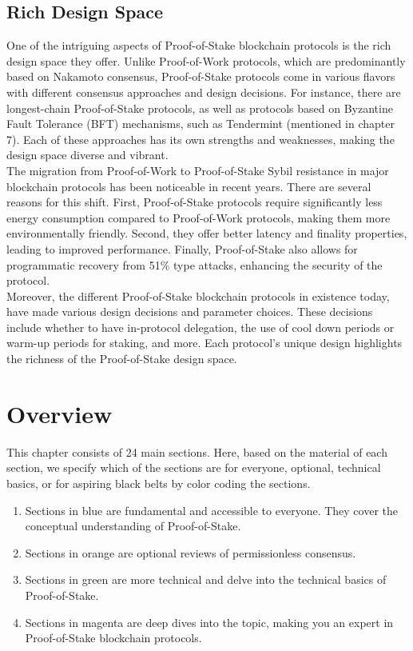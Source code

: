 \subsection*{Rich Design Space}
One of the intriguing aspects of Proof-of-Stake blockchain protocols is the rich design space they offer. Unlike Proof-of-Work protocols, which are predominantly based on Nakamoto consensus, Proof-of-Stake protocols come in various flavors with different consensus approaches and design decisions. For instance, there are longest-chain Proof-of-Stake protocols, as well as protocols based on Byzantine Fault Tolerance (BFT) mechanisms, such as Tendermint (mentioned in chapter 7). Each of these approaches has its own strengths and weaknesses, making the design space diverse and vibrant.\\
The migration from Proof-of-Work to Proof-of-Stake Sybil resistance in major blockchain protocols has been noticeable in recent years. There are several reasons for this shift. First, Proof-of-Stake protocols require significantly less energy consumption compared to Proof-of-Work protocols, making them more environmentally friendly. Second, they offer better latency and finality properties, leading to improved performance. Finally, Proof-of-Stake also allows for programmatic recovery from 51\% type attacks, enhancing the security of the protocol.\\
Moreover, the different Proof-of-Stake blockchain protocols in existence today, have made various design decisions and parameter choices. These decisions include whether to have in-protocol delegation, the use of cool down periods or warm-up periods for staking, and more. Each protocol's unique design highlights the richness of the Proof-of-Stake design space.

\section{Overview}
This chapter consists of 24 main sections. Here, based on the material of each section, we specify which of the sections are for everyone, optional, technical basics, or for aspiring black belts by color coding the sections.\\
\begin{enumerate}
  \item Sections in blue are fundamental and accessible to everyone. They cover the conceptual understanding of Proof-of-Stake.
  \item Sections in orange are optional reviews of permissionless consensus.
  \item Sections in green are more technical and delve into the technical basics of Proof-of-Stake.
  \item Sections in magenta are deep dives into the topic, making you an expert in Proof-of-Stake blockchain protocols.

\end{enumerate}

